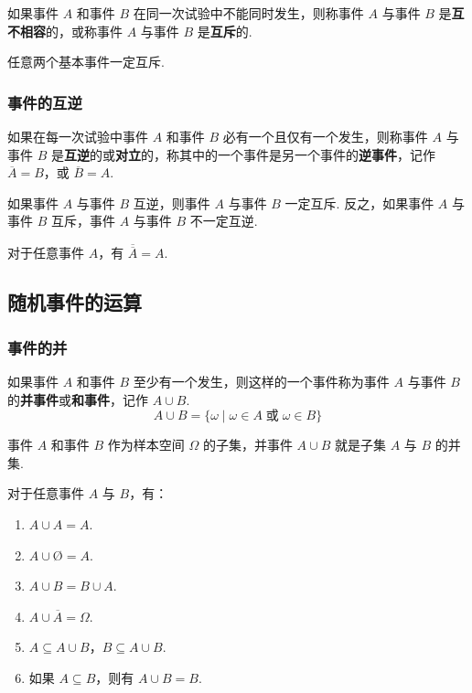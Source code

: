 如果事件 $A$ 和事件 $B$ 在同一次试验中不能同时发生，则称事件 $A$ 与事件 $B$ 是\textbf{互不相容}的，或称事件 $A$ 与事件 $B$ 是\textbf{互斥}的.

任意两个基本事件一定互斥.

\subsubsection{事件的互逆}

如果在每一次试验中事件 $A$ 和事件 $B$ 必有一个且仅有一个发生，则称事件 $A$ 与事件 $B$ 是\textbf{互逆}的或\textbf{对立}的，称其中的一个事件是另一个事件的\textbf{逆事件}，记作 $\overline{A}=B$，或 $\overline{B}=A$.

如果事件 $A$ 与事件 $B$ 互逆，则事件 $A$ 与事件 $B$ 一定互斥. 反之，如果事件 $A$ 与事件 $B$ 互斥，事件 $A$ 与事件 $B$ 不一定互逆.

\begin{property}
    \indent 对于任意事件 $A$，有 $\overline{\overline{A}}=A$.
\end{property}

\subsection{随机事件的运算}

\subsubsection{事件的并}

如果事件 $A$ 和事件 $B$ 至少有一个发生，则这样的一个事件称为事件 $A$ 与事件 $B$ 的\textbf{并事件}或\textbf{和事件}，记作 $A \cup B$.
$$
A \cup B = \{ \omega \mid \omega \in A \;\text{或}\; \omega \in B \}
$$

事件 $A$ 和事件 $B$ 作为样本空间 $\varOmega$ 的子集，并事件 $A \cup B$ 就是子集 $A$ 与 $B$ 的并集.

\begin{property}
    \indent 对于任意事件 $A$ 与 $B$，有：
    \begin{enumerate}
        \item $A \cup A = A$.
        \item $A \cup \text{\O} = A$.
        \item $A \cup B = B \cup A$.
        \item $A \cup \overline{A} = \varOmega$.
        \item $A \subseteq A \cup B$，$B \subseteq A \cup B$.
        \item 如果 $A \subseteq B$，则有 $A \cup B=B$.
    \end{enumerate}
\end{property}

